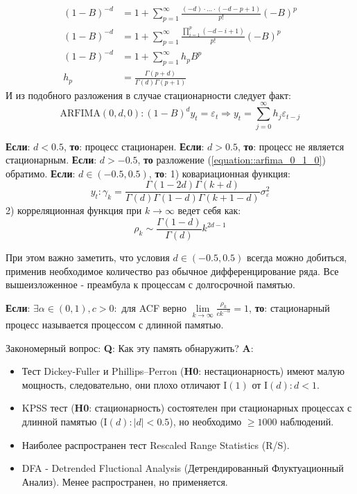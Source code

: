 \begin{equation}
	\begin{split}
		(1 - B)^{-d} & = 1 + \sum_{p = 1}^{\infty} \frac{(-d)\cdot \ldots \cdot (-d -p + 1)}{p!} (-B)^{p}\\
		(1 - B)^{-d} & = 1 + \sum_{p = 1}^{\infty} \frac{\prod_{i = 1}^{p}(-d - i + 1)}{p!} (-B)^{p}\\
		(1 - B)^{-d} & = 1 + \sum_{p = 1}^{\infty} h_pB^p\\
		h_p & = \frac{\Gamma(p + d)}{\Gamma(d)\Gamma(p + 1)}
	\end{split}
\end{equation}
И из подобного разложения \cite{quantil_2_2007} в случае стационарности следует факт:
\begin{equation} \label{equation::arfima_0_1_0}
	\text{ARFIMA}(0, d, 0): (1 - B)^d y_t = \varepsilon_{t} \Rightarrow y_t = \sum_{j = 0}^{\infty}h_j \varepsilon_{t - j}
\end{equation}
\begin{theorem}
	\textbf{Если}: $d < 0.5$, \textbf{то}: процесс стационарен. \textbf{Если}: $d > 0.5$, \textbf{то}: процесс не является стационарным. \textbf{Если}: $d > -0.5$, \textbf{то} разложение (\ref{equation::arfima_0_1_0}) обратимо. \textbf{Если}: $d \in (-0.5, 0.5)$, \textbf{то}: 1) ковариационная функция: $$y_t: \gamma_k = \frac{\Gamma(1 - 2d) \Gamma(k + d)}{\Gamma(d)\Gamma(1 - d)\Gamma(k + 1 - d)} \sigma^2_{\varepsilon}$$ 2) корреляционная функция при $k \to \infty$ ведет себя как: $$\rho_k \sim \frac{\Gamma(1 - d)}{\Gamma(d)}k^{2d - 1}$$
\end{theorem}
При этом важно заметить, что условия $d \in (-0.5, 0.5)$ всегда можно добиться, применив необходимое количество раз обычное дифференцирование ряда. Все вышеизложенное - преамбула к процессам с долгосрочной памятью.
\begin{definition}
	\textbf{Если}: $\exists \alpha \in (0, 1), c > 0:$ для ACF верно $\lim\limits_{k \to \infty} \frac{\rho_k}{ck^{-\alpha}} = 1$, \textbf{то}: стационарный процесс называется процессом с длинной памятью.
\end{definition}
Закономерный вопрос: \textbf{Q}: Как эту память обнаружить? \textbf{A}:
\begin{itemize}
	\item Тест Dickey-Fuller и Phillips–Perron (\textbf{H0}: нестационарность) имеют малую мощность, следовательно, они плохо отличают I$(1)$ от I$(d): d < 1$.
	\item KPSS тест (\textbf{H0}: стационарность) состоятелен при стационарных процессах с длинной памятью (I$(d): |d| < 0.5$), но необходимо $\ge 1000$ наблюдений.
	\item Наиболее распространен тест Rescaled Range Statistics (R/S). 
	\item DFA - Detrended Fluctional Analysis (Детрендированный Флуктуационный Анализ). Менее распространен, но применяется.
\end{itemize}
